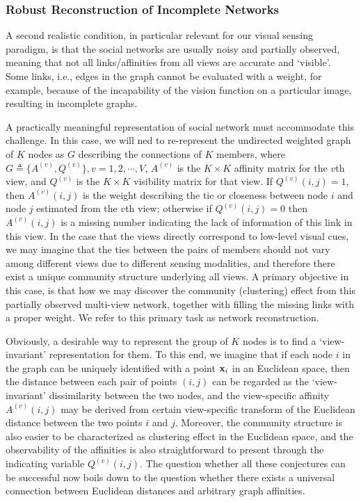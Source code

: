 \subsubsection{Robust Reconstruction of Incomplete Networks}
\label{sec:reconstruct}

A second realistic condition, in particular relevant for our visual sensing paradigm, is that the social networks are usually noisy and partially observed, meaning that not all links/affinities from all views are accurate and `visible'. Some links, i.e., edges in the graph cannot be evaluated with a weight, for example, because of the incapability of the vision function on a particular image, resulting in incomplete graphs.

A practically meaningful representation of social network must accommodate this challenge. In this case, we will ned to re-represent the undirected weighted graph of $K$ nodes as $G$ describing the connections of $K$ members, where $G\triangleq\{A^{(v)}, Q^{(v)}\}, v=1,2,\cdots,V$, $A^{(v)}$ is the $K\times K$ affinity matrix for the $v$th view, and $Q^{(v)}$ is the $K\times K$ visibility matrix for that view. If $Q^{(v)}(i,j)=1$, then $A^{(v)}(i,j)$ is the weight describing the tie or closeness between node $i$ and node $j$ estimated from the $v$th view; otherwise if $Q^{(v)}(i,j)=0$ then $A^{(v)}(i,j)$ is a missing number indicating the lack of information of this link in this view. In the case that the views directly correspond to low-level visual cues, we may imagine that the ties between the pairs of members should not vary among different views due to different sensing modalities, and therefore there exist a unique community structure underlying all views. A primary objective in this case, is that how we may discover the community (clustering) effect from this partially observed multi-view network, together with filling the missing links with a proper weight. We refer to this primary task as network reconstruction.

Obviously, a desirable way to represent the group of $K$ nodes is to find a `view-invariant' representation for them. To this end, we imagine that if each node $i$ in the graph can be uniquely identified with a point ${\bf x}_i$ in an Euclidean space, then the distance between each pair of points $(i,j)$ can be regarded as the `view-invariant' dissimilarity between the two nodes, and the view-specific affinity $A^{(v)}(i,j)$ may be derived from certain view-specific transform of the Euclidean distance between the two points $i$ and $j$. Moreover, the community structure is also easier to be characterized as clustering effect in the Euclidean space, and the observability of the affinities is also straightforward to present through the indicating variable $Q^{(v)}(i,j)$. The question whether all these conjectures can be successful now boils down to the question whether there exists a universal connection between Euclidean distances and arbitrary graph affinities.

